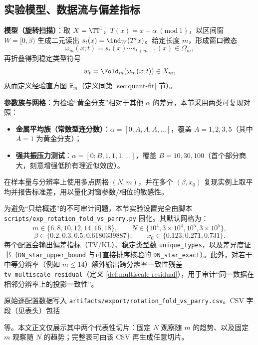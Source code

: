 \subsection{实验模型、数据流与偏差指标}


\textbf{模型（旋转扫描）}：取 $X=\TT^1$，$T(x)=x+\alpha\ (\mathrm{mod}\ 1)$，以区间窗 $W=[0,\beta)$ 生成二元读出 $s_t(x)=\ind_W(T^t x)$。给定长度 $m$，形成窗口微态
\[
\omega_m(x;t)=s_t(x)\cdots s_{t+m-1}(x)\in\Omega_m,
\]
再折叠得到稳定类型符号
\[
w_t=\Fold_m(\omega_m(x;t))\in X_m,
\]
从而定义经验直方图 $\hat{\pi}_m$（定义同第 \ref{sec:quant-fit} 节）。

\textbf{参数族与网格}：为检验“黄金分支”相对于其他 $\alpha$ 的差异，本节采用两类可复现对照：
\begin{itemize}
  \item \textbf{金属平均族（常数型连分数）}：$\alpha=[0;A,A,A,\dots]$，覆盖 $A=1,2,3,5$（其中 $A=1$ 为黄金分支）；
  \item \textbf{强共振压力测试}：$\alpha=[0;B,1,1,1,\dots]$，覆盖 $B=10,30,100$（首个部分商大，刻意增强低阶有理近似效应）。
\end{itemize}
在样本量与分辨率上使用多点网格 $(N,m)$，并在多个 $(\beta,x_0)$ 复现实例上取平均并报告标准差，用以量化对窗参数/相位的敏感性。

\begin{remark}[数据与方案的脚本精确口径]\label{rem:exp-script-spec}
为避免“只给概述”的不可审计问题，本节实验设置完全由脚本 \verb|scripts/exp_rotation_fold_vs_parry.py| 固化。其默认网格为：
\[
m\in\{6,8,10,12,14,16,18\},\qquad
N\in\{10^4,3\times 10^4,10^5,3\times 10^5\},
\]
\[
\beta\in\{0.2,0.3,0.5,0.6180339887\},\qquad
x_0\in\{0.123,0.271,0.731\}.
\]
每个配置会输出偏差指标（TV/KL）、稳定类型数 \texttt{unique\_types}，以及差异度证书（\texttt{DN\_star\_upper\_bound} 与可直接排序核验的 \texttt{DN\_star\_exact}）。此外，对若干中等分辨率（例如 $m\le 14$）额外输出跨分辨率一致性残差 \texttt{tv\_multiscale\_residual}（定义 \ref{def:multiscale-residual}），用于审计“同一数据在相邻分辨率上的投影一致性”。
\end{remark}

\begin{remark}[原始数据文件与字段说明]\label{rem:exp-data-files}
\begin{sloppypar}
原始逐配置数据写入 \texttt{artifacts/export/rotation\_fold\_vs\_parry.csv}。CSV 字段（见表头）包括
\begin{center}
\end{center}
等。本文正文仅展示其中两个代表性切片：固定 $N$ 观察随 $m$ 的趋势、以及固定 $m$ 观察随 $N$ 的趋势；完整表可由该 CSV 再生成任意切片。
\end{sloppypar}
\end{remark}

